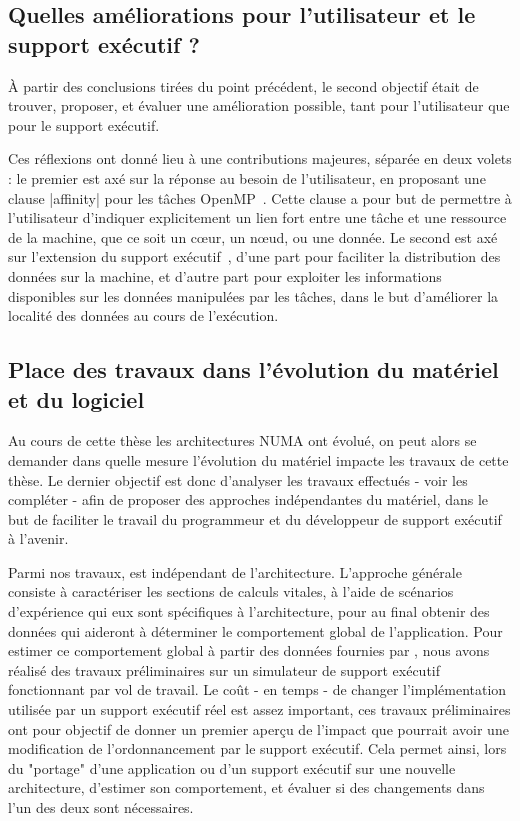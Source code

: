 \subsection*{Quelles améliorations pour l'utilisateur et le support exécutif ?}

À partir des conclusions tirées du point précédent, le second objectif était de trouver, proposer, et évaluer une amélioration possible, tant pour l'utilisateur que pour le support exécutif.

Ces réflexions ont donné lieu à une contributions majeures, séparée en deux volets : le premier est axé sur la réponse au besoin de l'utilisateur, en proposant une clause |affinity| pour les tâches OpenMP~\cite{Virouleau2016b}.
Cette clause a pour but de permettre à l'utilisateur d'indiquer explicitement un lien fort entre une tâche et une ressource de la machine, que ce soit un cœur, un nœud, ou une donnée.
Le second est axé sur l'extension du support exécutif~\cite{Virouleau2016a}, d'une part pour faciliter la distribution des données sur la machine, et d'autre part pour exploiter les informations disponibles sur les données manipulées par les tâches, dans le but d'améliorer la localité des données au cours de l'exécution.


\subsection*{Place des travaux dans l'évolution du matériel et du logiciel}

Au cours de cette thèse les architectures NUMA ont évolué, on peut alors se demander dans quelle mesure l'évolution du matériel impacte les travaux de cette thèse.
Le dernier objectif est donc d'analyser les travaux effectués - voir les compléter - afin de proposer des approches indépendantes du matériel, dans le but de faciliter le travail du programmeur et du développeur de support exécutif à l'avenir.

Parmi nos travaux, \outil est indépendant de l'architecture. L'approche générale consiste à caractériser les sections de calculs vitales, à l'aide de scénarios d'expérience qui eux sont spécifiques à l'architecture, pour au final obtenir des données qui aideront à déterminer le comportement global de l'application.
Pour estimer ce comportement global à partir des données fournies par \outil, nous avons réalisé des travaux préliminaires sur un simulateur de support exécutif fonctionnant par vol de travail.
Le coût - en temps - de changer l'implémentation utilisée par un support exécutif réel est assez important, ces travaux préliminaires ont pour objectif de donner un premier aperçu de l'impact que pourrait avoir une modification de l'ordonnancement par le support exécutif.
Cela permet ainsi, lors du "portage" d'une application ou d'un support exécutif sur une nouvelle architecture, d'estimer son comportement, et évaluer si des changements dans l'un des deux sont nécessaires.
